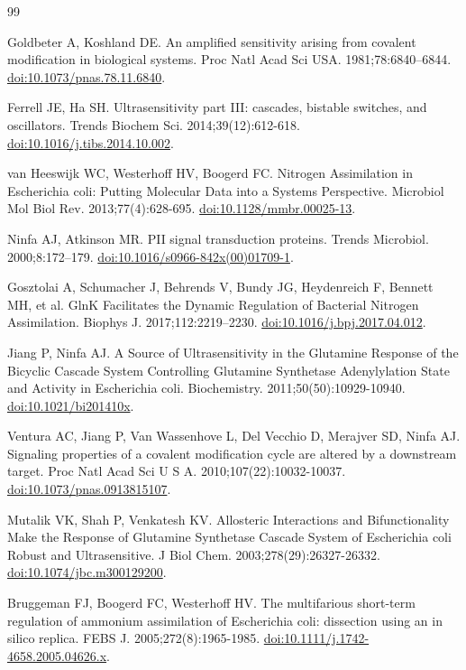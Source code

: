 \documentclass[10pt,letterpaper]{article}
\begin{document}
\begin{thebibliography}{99}

Goldbeter A, Koshland DE. An amplified sensitivity arising from covalent modification in biological systems. Proc Natl Acad Sci USA. 1981;78:6840--6844. \href{https://doi.org/10.1073/pnas.78.11.6840}{doi:10.1073/pnas.78.11.6840}.

Ferrell JE, Ha SH. Ultrasensitivity part III: cascades, bistable switches, and oscillators. Trends Biochem Sci. 2014;39(12):612-618. \href{https://doi.org/10.1016/j.tibs.2014.10.002}{doi:10.1016/j.tibs.2014.10.002}.

van Heeswijk WC, Westerhoff HV, Boogerd FC. Nitrogen Assimilation in Escherichia coli: Putting Molecular Data into a Systems Perspective. Microbiol Mol Biol Rev. 2013;77(4):628-695. \href{https://doi.org/10.1128/mmbr.00025-13}{doi:10.1128/mmbr.00025-13}.

Ninfa AJ, Atkinson MR. PII signal transduction proteins. Trends Microbiol. 2000;8:172--179. \href{https://doi.org/10.1016/s0966-842x(00)01709-1}{doi:10.1016/s0966-842x(00)01709-1}.

Gosztolai A, Schumacher J, Behrends V, Bundy JG, Heydenreich F, Bennett MH, et al. GlnK Facilitates the Dynamic Regulation of Bacterial Nitrogen Assimilation. Biophys J. 2017;112:2219--2230. \href{https://doi.org/10.1016/j.bpj.2017.04.012}{doi:10.1016/j.bpj.2017.04.012}.

Jiang P, Ninfa AJ. A Source of Ultrasensitivity in the Glutamine Response of the Bicyclic Cascade System Controlling Glutamine Synthetase Adenylylation State and Activity in Escherichia coli. Biochemistry. 2011;50(50):10929-10940. \href{https://doi.org/10.1021/bi201410x}{doi:10.1021/bi201410x}.

Ventura AC, Jiang P, Van Wassenhove L, Del Vecchio D, Merajver SD, Ninfa AJ. Signaling properties of a covalent modification cycle are altered by a downstream target. Proc Natl Acad Sci U S A. 2010;107(22):10032-10037. \href{https://doi.org/10.1073/pnas.0913815107}{doi:10.1073/pnas.0913815107}.

Mutalik VK, Shah P, Venkatesh KV. Allosteric Interactions and Bifunctionality Make the Response of Glutamine Synthetase Cascade System of Escherichia coli Robust and Ultrasensitive. J Biol Chem. 2003;278(29):26327-26332. \href{https://doi.org/10.1074/jbc.m300129200}{doi:10.1074/jbc.m300129200}.

Bruggeman FJ, Boogerd FC, Westerhoff HV. The multifarious short-term regulation of ammonium assimilation of Escherichia coli: dissection using an in silico replica. FEBS J. 2005;272(8):1965-1985. \href{https://doi.org/10.1111/j.1742-4658.2005.04626.x}{doi:10.1111/j.1742-4658.2005.04626.x}.


\end{thebibliography}
\end{document}
